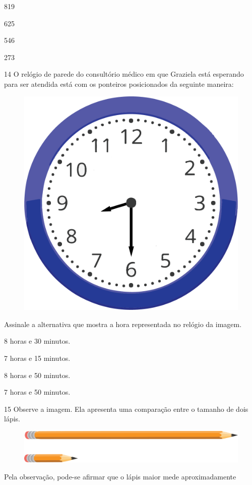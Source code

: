 \begin{multicols}{2}
\begin{escolha}
\item
  819
\item
  625
\item
  546
\item
  273
\end{escolha}
\end{multicols}


\num{14} O relógio de parede do consultório médico em que Graziela está esperando
para ser atendida está com os ponteiros posicionados da seguinte maneira:

\begin{figure}[htpb!]
\centering
\includegraphics[width=.4\textwidth]{./media/image100.png}
\end{figure}

Assinale a alternativa que mostra a hora representada no relógio da imagem.

\begin{escolha}
\item
  8 horas e 30 minutos.
\item
  7 horas e 15 minutos.
\item
  8 horas e 50 minutos.
\item
  7 horas e 50 minutos.
\end{escolha}


\num{15} Observe a imagem. Ela apresenta uma comparação entre o tamanho de dois lápis.

\begin{figure}[htpb!]
\centering
\includegraphics[width=\textwidth]{./media/image101.png}
\end{figure}

Pela observação, pode-se afirmar que o lápis maior mede aproximadamente

